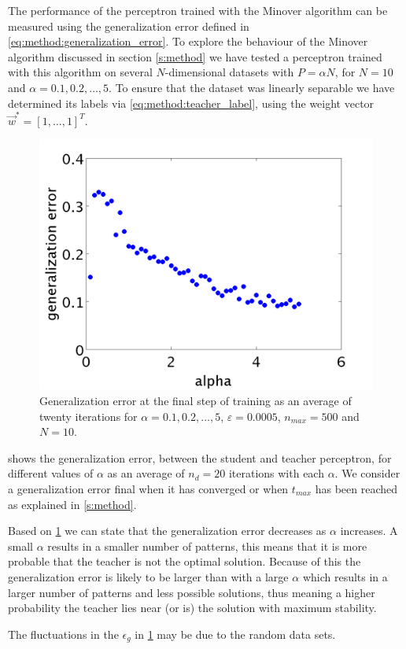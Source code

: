 The performance of the perceptron trained with the Minover algorithm can be measured using the generalization error defined in \autoref{eq:method:generalization_error}. To explore the behaviour of the Minover algorithm discussed in section \ref{s:method} we have tested a perceptron trained with this algorithm on several $N$-dimensional datasets with $P = \alpha N$, for $N = 10$ and $\alpha = 0.1, 0.2, \dotsc, 5$. To ensure that the dataset was linearly separable we have determined its labels via \eqref{eq:method:teacher_label}, using the weight vector $\vec{w}^* = [1, \dotsc, 1]^T$.\\

\begin{figure}[b]
	\centering
	\includegraphics[width=0.9\columnwidth]{./img/finalgeneralizationerrors}
	\caption{Generalization error at the final step of training as an average of twenty iterations for $\alpha = 0.1, 0.2, \dotsc, 5$, $\varepsilon = 0.0005$, $n_{max} = 500$ and $N = 10$.}
	\label{fig:exp:finalgeneralizationError}
\end{figure}

 shows the generalization error, between the student and teacher perceptron, for different values of $\alpha$ as an average of $n_d = 20$ iterations with each $\alpha$. We consider a generalization error final when it has converged or when $t_{max}$ has been reached as explained in \cref{s:method}. 

Based on \cref{fig:exp:finalgeneralizationError} we can state that the generalization error decreases as $\alpha$ increases. A small $\alpha$ results in a smaller number of patterns, this means that it is more probable that the teacher is not the optimal solution. Because of this the generalization error is likely to be larger than with a large $\alpha$ which results in a larger number of patterns and less possible solutions, thus meaning a higher probability the teacher lies near (or is) the solution with maximum stability.

The fluctuations in the $\epsilon_g$ in \cref{fig:exp:finalgeneralizationError} may be due to the random data sets.\\